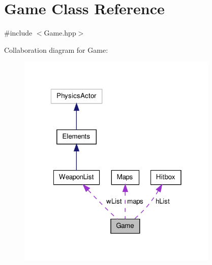 \hypertarget{class_game}{\section{Game Class Reference}
\label{class_game}
}


{\ttfamily \#include $<$Game.\-hpp$>$}



Collaboration diagram for Game\-:
\nopagebreak
\begin{figure}[H]
\begin{center}
\leavevmode
\includegraphics[width=271pt]{class_game__coll__graph}
\end{center}
\end{figure}

